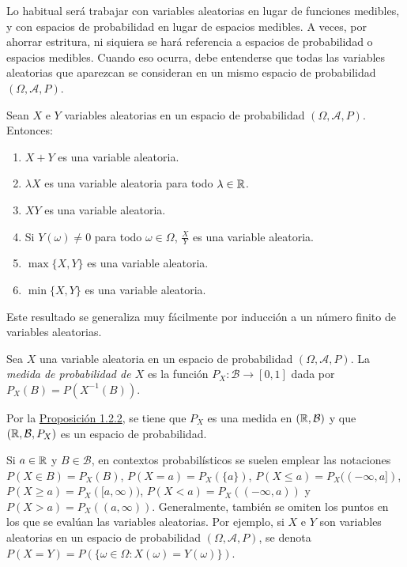 \documentclass[a4paper, 11pt, extrafontsizes]{memoir}
\begin{document}
Lo habitual será trabajar con variables aleatorias en lugar de funciones medibles, y con espacios de probabilidad en lugar de espacios medibles. A veces, por ahorrar estritura, ni siquiera se hará referencia a espacios de probabilidad o espacios medibles. Cuando eso ocurra, debe entenderse que todas las variables aleatorias que aparezcan se consideran en un mismo espacio de probabilidad $(\Omega,\mathcal{A},P)$.

\begin{proposition}
    Sean $X$ e $Y$ variables aleatorias en un espacio de probabilidad $(\Omega,\mathcal{A},P)$. Entonces:
    \begin{enumerate}
        \item $X+Y$ es una variable aleatoria.
        \item $\lambda X$ es una variable aleatoria para todo $\lambda \in \mathbb R$.
        \item $XY$ es una variable aleatoria.
        \item Si $Y(\omega) \neq 0$ para todo $\omega \in \Omega$, $\frac{X}{Y}$ es una variable aleatoria.
        \item $\max\{X,Y\}$ es una variable aleatoria.
        \item $\min\{X,Y\}$ es una variable aleatoria.
    \end{enumerate}
\end{proposition}

Este resultado se generaliza muy fácilmente por inducción a un número finito de variables aleatorias.

\begin{definition}
    Sea $X$ una variable aleatoria en un espacio de probabilidad $(\Omega,\mathcal{A},P)$. La \emph{medida de probabilidad de $X$} es la función $P_X \colon \mathcal{B} \to [0,1]$ dada por $P_X(B) = P(X^{-1}(B))$.
\end{definition}

Por la \hyperref[pro:1.2.2]{\color{gray}Proposición 1.2.2}, se tiene que $P_X$ es una medida en $(\mathbb R,\mathcal{B})$ y que $(\mathbb R,\mathcal{B},P_X)$ es un espacio de probabilidad. 
    
Si $a \in \mathbb R$ y $B \in \mathcal{B}$, en contextos probabilísticos se suelen emplear las notaciones $P(X \in B) = P_X(B)$, $P(X = a) = P_X(\{a\})$, $P(X \leq a) = P_X((-\infty,a])$, $P(X \geq a) = P_X([a,\infty))$,  $P(X < a) = P_X((-\infty,a))$ y  $P(X > a) = P_X((a,\infty))$. Generalmente, también se omiten los puntos en los que se evalúan las variables aleatorias. Por ejemplo, si $X$ e $Y$ son variables aleatorias en un espacio de probabilidad $(\Omega,\mathcal{A},P)$, se denota $P(X=Y)=P(\{\omega \in \Omega \colon X(\omega) = Y(\omega)\})$.
\end{document}
